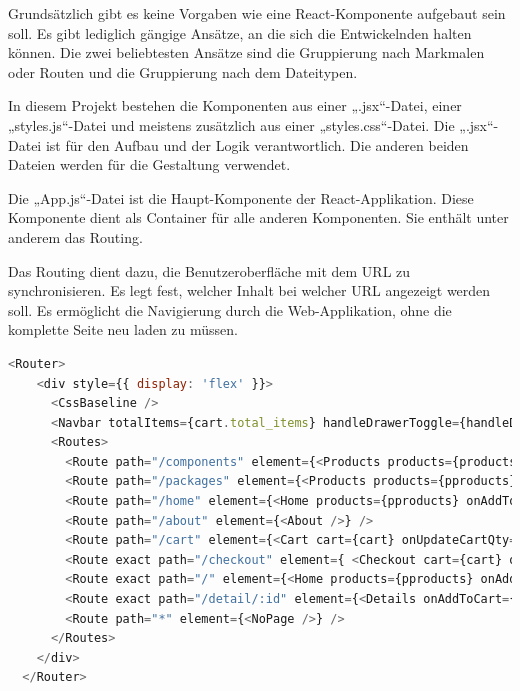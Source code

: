Grundsätzlich gibt es keine Vorgaben wie eine React-Komponente aufgebaut sein soll. Es gibt lediglich gängige Ansätze, an die sich die Entwickelnden halten können. Die zwei beliebtesten Ansätze sind die Gruppierung nach Markmalen oder Routen und die Gruppierung nach dem Dateitypen.
\cite{reactComponents}

In diesem Projekt bestehen die Komponenten aus einer „.jsx“-Datei, einer „styles.js“-Datei und meistens zusätzlich aus einer „styles.css“-Datei. Die „.jsx“-Datei ist für den Aufbau und der Logik verantwortlich. Die anderen beiden Dateien werden für die Gestaltung verwendet.

Die „App.js“-Datei ist die Haupt-Komponente der React-Applikation. Diese Komponente dient als Container für alle anderen Komponenten. Sie enthält unter anderem das Routing.
\cite{appJS}

Das Routing dient dazu, die Benutzeroberfläche mit dem URL zu synchronisieren. Es legt fest, welcher Inhalt bei welcher URL angezeigt werden soll. Es ermöglicht die Navigierung durch die Web-Applikation, ohne die komplette Seite neu laden zu müssen. 
\cite{reactRouting}

\begin{lstlisting}[language=JavaScript, caption=Source-Code des Routers, label=lst:impl:reactRouterSourceCode]
  <Router>
    <div style={{ display: 'flex' }}>
      <CssBaseline />
      <Navbar totalItems={cart.total_items} handleDrawerToggle={handleDrawerToggle} />
      <Routes>
        <Route path="/components" element={<Products products={products} onAddToCart={handleAddToCart} handleUpdateCartQty />} />
        <Route path="/packages" element={<Products products={pproducts} onAddToCart={handleAddToCart} handleUpdateCartQty />} />
        <Route path="/home" element={<Home products={pproducts} onAddToCart={handleAddToCart} handleUpdateCartQty/>} />
        <Route path="/about" element={<About />} />
        <Route path="/cart" element={<Cart cart={cart} onUpdateCartQty={handleUpdateCartQty} onRemoveFromCart={handleRemoveFromCart} onEmptyCart={handleEmptyCart} /> } />
        <Route exact path="/checkout" element={ <Checkout cart={cart} order={order} onCaptureCheckout={handleCaptureCheckout} error={errorMessage} /> } />
        <Route exact path="/" element={<Home products={pproducts} onAddToCart={handleAddToCart} handleUpdateCartQty/>} />
        <Route exact path="/detail/:id" element={<Details onAddToCart={handleAddToCart} handleUpdateCartQty />} />
        <Route path="*" element={<NoPage />} />
      </Routes>
    </div>
  </Router> 
\end{lstlisting}

